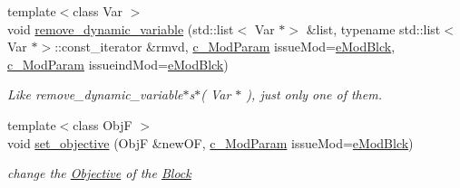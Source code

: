 \begin{Indent}
\begin{DoxyCompactItemize}
\mbox{\label{class_s_m_spp__di__unipi__it_1_1_block_a11ab0d4817de9e1e15f70755f2f0a878}} 
{\footnotesize template$<$class Var $>$ }\\void \mbox{\hyperlink{class_s_m_spp__di__unipi__it_1_1_block_a11ab0d4817de9e1e15f70755f2f0a878}{remove\+\_\+dynamic\+\_\+variable}} (std\+::list$<$ Var $\ast$$>$ \&list, typename std\+::list$<$ Var $\ast$$>$\+::const\+\_\+iterator \&rmvd, \mbox{\hyperlink{group___modification___t_y_p_e_s_ga544246d8c462e9a2d817c2c30797968f}{c\+\_\+\+Mod\+Param}} issue\+Mod=\mbox{\hyperlink{group___modification___t_y_p_e_s_gga48fddcdd03a03f49b7e389ca1ed938d4a21b14b26b1c0093a0905f6fc010bad29}{e\+Mod\+Blck}}, \mbox{\hyperlink{group___modification___t_y_p_e_s_ga544246d8c462e9a2d817c2c30797968f}{c\+\_\+\+Mod\+Param}} issueind\+Mod=\mbox{\hyperlink{group___modification___t_y_p_e_s_gga48fddcdd03a03f49b7e389ca1ed938d4a21b14b26b1c0093a0905f6fc010bad29}{e\+Mod\+Blck}})
\begin{DoxyCompactList}\small\item\em Like remove\+\_\+dynamic\+\_\+variable$\ast$s$\ast$( Var $\ast$ ), just only one of them. \end{DoxyCompactList}\item 
{\footnotesize template$<$class ObjF $>$ }\\void \mbox{\hyperlink{class_s_m_spp__di__unipi__it_1_1_block_a11eb0629a8dc10c24ec9c71e48aa7a26}{set\+\_\+objective}} (ObjF \&new\+OF, \mbox{\hyperlink{group___modification___t_y_p_e_s_ga544246d8c462e9a2d817c2c30797968f}{c\+\_\+\+Mod\+Param}} issue\+Mod=\mbox{\hyperlink{group___modification___t_y_p_e_s_gga48fddcdd03a03f49b7e389ca1ed938d4a21b14b26b1c0093a0905f6fc010bad29}{e\+Mod\+Blck}})
\begin{DoxyCompactList}\small\item\em change the \mbox{\hyperlink{class_s_m_spp__di__unipi__it_1_1_objective}{Objective}} of the \mbox{\hyperlink{class_s_m_spp__di__unipi__it_1_1_block}{Block}} \end{DoxyCompactList}\end{DoxyCompactItemize}
\end{Indent}
